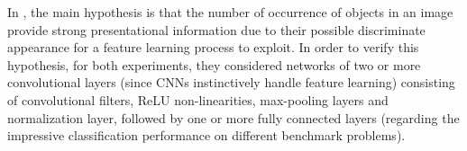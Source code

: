 In \cite{segui2015learning}, the main hypothesis is that the number of occurrence of objects in an image provide strong presentational information due to their possible discriminate appearance for a feature learning process to exploit. In order to verify this hypothesis, for both experiments, they considered networks of two or more convolutional layers (since CNNs instinctively handle feature learning\cite{lecun1989backpropagation}) consisting of convolutional filters, ReLU non-linearities, max-pooling layers and normalization layer,   followed by one or more fully connected layers (regarding the impressive classification performance on different benchmark problems\cite{krizhevsky2012imagenet, Karpathy_2014_CVPR, ciresan2011flexible})\cite{segui2015learning}. 







  



